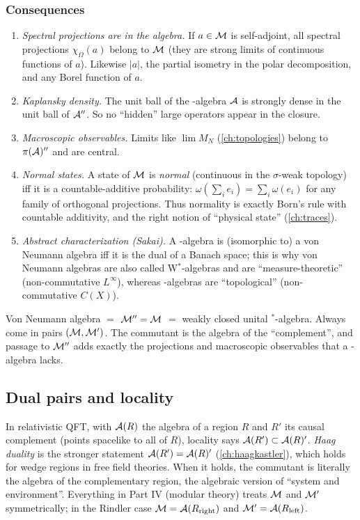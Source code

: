 \subsubsection*{Consequences}
\begin{enumerate}
\item \emph{Spectral projections are in the algebra.} If $a\in\mathcal{M}$ is self-adjoint, all spectral projections $\chi_\Omega(a)$ belong to $\mathcal{M}$ (they are strong limits of continuous functions of $a$). Likewise $|a|$, the partial isometry in the polar decomposition, and any Borel function of $a$.
\item \emph{Kaplansky density.} The unit ball of the \cstar-algebra $\mathcal{A}$ is strongly dense in the unit ball of $\mathcal{A}''$. So no ``hidden'' large operators appear in the closure.
\item \emph{Macroscopic observables.} Limits like $\lim M_N$ (\cref{ch:topologies}) belong to $\pi(\mathcal{A})''$ and are central.
\item \emph{Normal states.} A state of $\mathcal{M}$ is \emph{normal} (continuous in the $\sigma$-weak topology) iff it is a countable-additive probability: $\omega(\sum_ie_i)=\sum_i\omega(e_i)$ for any family of orthogonal projections. Thus normality is exactly Born's rule with countable additivity, and the right notion of ``physical state'' (\cref{ch:traces}).
\item \emph{Abstract characterization (Sakai).} A \cstar-algebra is (isomorphic to) a von Neumann algebra iff it is the dual of a Banach space; this is why von Neumann algebras are also called W$^*$-algebras and are ``measure-theoretic'' (non-commutative $L^\infty$), whereas \cstar-algebras are ``topological'' (non-commutative $C(X)$).
\end{enumerate}

\begin{keyidea}
Von Neumann algebra $=$ $\mathcal{M}''=\mathcal{M}$ $=$ weakly closed unital $^*$-algebra. Always come in pairs $(\mathcal{M},\mathcal{M}')$. The commutant is the algebra of the ``complement'', and passage to $\mathcal{M}''$ adds exactly the projections and macroscopic observables that a \cstar-algebra lacks.
\end{keyidea}

\subsection{Dual pairs and locality}

In relativistic QFT, with $\mathcal{A}(R)$ the algebra of a region $R$ and $R'$ its causal complement (points spacelike to all of $R$), locality says $\mathcal{A}(R')\subset\mathcal{A}(R)'$. \emph{Haag duality} is the stronger statement $\mathcal{A}(R')=\mathcal{A}(R)'$ (\cref{ch:haagkastler}), which holds for wedge regions in free field theories. When it holds, the commutant is literally the algebra of the complementary region, the algebraic version of ``system and environment''. Everything in Part IV (modular theory) treats $\mathcal{M}$ and $\mathcal{M}'$ symmetrically; in the Rindler case $\mathcal{M}=\mathcal{A}(R_{\rm right})$ and $\mathcal{M}'=\mathcal{A}(R_{\rm left})$.

